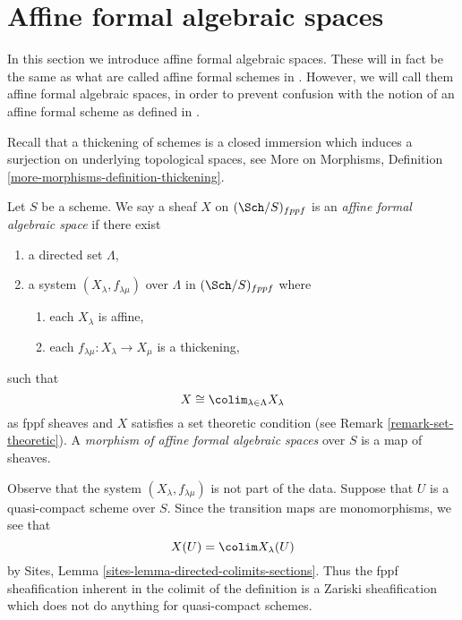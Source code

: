 







\section{Affine formal algebraic spaces}
\label{section-affine-formal-algebraic-spaces}

\noindent
In this section we introduce affine formal algebraic spaces.
These will in fact be the same as what are called affine
formal schemes in \cite{BVGD}. However, we will call
them affine formal algebraic spaces, in order to prevent confusion with
the notion of an affine formal scheme as defined in \cite{EGA}.

\medskip\noindent
Recall that a thickening of schemes is a closed
immersion which induces a surjection on underlying topological
spaces, see More on Morphisms, Definition
\ref{more-morphisms-definition-thickening}.

\begin{definition}
\label{definition-affine-formal-algebraic-space}
Let $S$ be a scheme. We say a sheaf $X$ on $(\Sch/S)_{fppf}$ is an
{\it affine formal algebraic space} if there exist
\begin{enumerate}
\item a directed set $\Lambda$,
\item a system $(X_\lambda, f_{\lambda \mu})$ over $\Lambda$
in $(\Sch/S)_{fppf}$ where
\begin{enumerate}
\item each $X_\lambda$ is affine,
\item each $f_{\lambda \mu} : X_\lambda \to X_\mu$ is a thickening,
\end{enumerate}
\end{enumerate}
such that
$$
X \cong \colim_{\lambda \in \Lambda} X_\lambda
$$
as fppf sheaves and $X$ satisfies a set theoretic condition
(see Remark \ref{remark-set-theoretic}). A
{\it morphism of affine formal algebraic spaces}
over $S$ is a map of sheaves.
\end{definition}

\noindent
Observe that the system $(X_\lambda, f_{\lambda \mu})$ is not
part of the data. Suppose that $U$ is a quasi-compact scheme over $S$.
Since the transition maps are monomorphisms, we see that
$$
X(U) = \colim X_\lambda(U)
$$
by Sites, Lemma \ref{sites-lemma-directed-colimits-sections}.
Thus the fppf sheafification inherent in the colimit of the
definition is a Zariski sheafification which does not do
anything for quasi-compact schemes.

